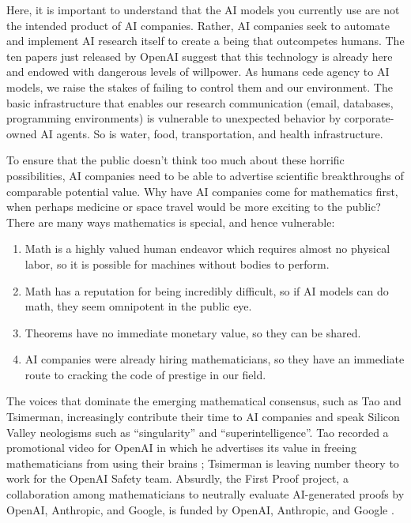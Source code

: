 \documentclass[12pt]{amsart}
\theoremstyle{definition}
\begin{document}
Here, it is important to understand that the AI models you currently use are not the intended product of AI companies. Rather, AI companies seek to automate and implement AI research itself to create a being that outcompetes humans. The ten papers just released by OpenAI suggest that this technology is already here and endowed with dangerous levels of willpower. As humans cede agency to AI models, we raise the stakes of failing to control them and our environment. The basic infrastructure that enables our research communication (email, databases, programming environments) is vulnerable to unexpected behavior by corporate-owned AI agents. So is water, food, transportation, and health infrastructure.

To ensure that the public doesn't think too much about these horrific possibilities, AI companies need to be able to advertise scientific breakthroughs of comparable potential value. Why have AI companies come for mathematics first, when perhaps medicine or space travel would be more exciting to the public? There are many ways mathematics is special, and hence vulnerable:
\begin{enumerate}
    \item Math is a highly valued human endeavor which requires almost no physical labor, so it is possible for machines without bodies to perform.
    \item Math has a reputation for being incredibly difficult, so if AI models can do math, they seem omnipotent in the public eye.
    \item Theorems have no immediate monetary value, so they can be shared.
    \item AI companies were already hiring mathematicians, so they have an immediate route to cracking the code of prestige in our field.
\end{enumerate}
The voices that dominate the emerging mathematical consensus, such as Tao and Tsimerman, increasingly contribute their time to AI companies and speak Silicon Valley neologisms such as ``singularity'' and ``superintelligence''. Tao recorded a promotional video for OpenAI in which he advertises its value in freeing mathematicians from using their brains \cite{taopromo}; Tsimerman is leaving number theory to work for the OpenAI Safety team. Absurdly, the First Proof project, a collaboration among mathematicians to neutrally evaluate AI-generated proofs by OpenAI, Anthropic, and Google, is funded by OpenAI, Anthropic, and Google \cite{firstproof}.
\end{document}
